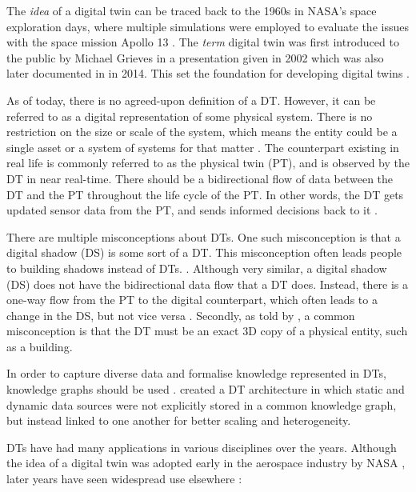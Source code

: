 \documentclass{article}
\begin{document}
The \emph{idea} of a digital twin can be traced back to the 1960s in NASA's space exploration days, where multiple simulations were employed to evaluate the issues with the space mission Apollo 13 \cite{noauthor_digital_nodate, fuller_digital_2020}. The \emph{term} digital twin was first introduced to the public by Michael Grieves in a presentation given in 2002 which was also later documented in \cite{grieves_michael_digital_2014} in 2014. This set the foundation for developing digital twins \cite{grieves_michael_digital_2014, fuller_digital_2020}.

As of today, there is no agreed-upon definition of a DT. However, it can be referred to as a digital representation of some physical system. There is no restriction on the size or scale of the system, which means the entity could be a single asset or a system of systems for that matter \cite{li_digital_2022, waszak_let_2022}. The  counterpart existing in real life is commonly referred to as the physical twin (PT), and is observed by the DT in near real-time. There should be a bidirectional flow of data between the DT and the PT throughout the life cycle of the PT. In other words, the DT gets updated sensor data from the PT, and sends informed decisions back to it \cite{madni_leveraging_2019, waszak_let_2022, kamburjan_digital_2022}.



There are multiple misconceptions about DTs. One such misconception is that a digital shadow (DS) is some sort of a DT. This misconception often leads people to building shadows instead of DTs. \cite{fuller_digital_2020, li_digital_2022}.  Although very similar, a digital shadow (DS) does not have the bidirectional data flow that a DT does. Instead, there is a one-way flow from the PT to the digital counterpart, which often leads to a change in the DS, but not vice versa \cite{kritzinger_digital_2018, li_digital_2022}. Secondly, as told by \citeauthor{fuller_digital_2020}, a common misconception is that the DT must be an exact 3D copy of a physical entity, such as a building.

In order to capture diverse data and formalise knowledge represented in DTs, knowledge graphs should be used \cite{kamburjan_programming_2021, waszak_let_2022}. \citeauthor{waszak_let_2022} created a DT architecture in which static and dynamic data sources were not explicitly stored in a common knowledge graph, but instead linked to one another for better scaling and heterogeneity.

DTs have had many applications in various disciplines over the years. Although the idea of a digital twin was adopted early in the aerospace industry by NASA \cite{li_digital_2022}, later years have seen widespread use elsewhere \cite{fuller_digital_2020, waszak_let_2022, macchi_exploring_2018}:
\end{document}
